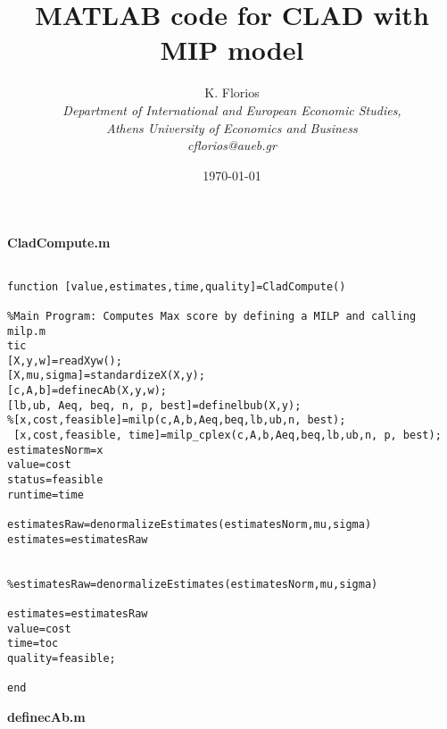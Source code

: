\documentclass[12pt]{article}
\begin{document}
\title{MATLAB code for CLAD with MIP model}
\author{K. Florios\\\textit{Department of International and European Economic Studies,}\\\textit{Athens University of Economics and Business}\\\textit{cflorios@aueb.gr}}
\date{\today}\maketitle


{\vspace*{1cm}}



\newpage

\textbf{CladCompute.m}

\begin{lstlisting}

function [value,estimates,time,quality]=CladCompute()

%Main Program: Computes Max score by defining a MILP and calling milp.m
tic
[X,y,w]=readXyw();
[X,mu,sigma]=standardizeX(X,y);
[c,A,b]=definecAb(X,y,w);
[lb,ub, Aeq, beq, n, p, best]=definelbub(X,y);
%[x,cost,feasible]=milp(c,A,b,Aeq,beq,lb,ub,n, best);
 [x,cost,feasible, time]=milp_cplex(c,A,b,Aeq,beq,lb,ub,n, p, best);
estimatesNorm=x
value=cost
status=feasible
runtime=time

estimatesRaw=denormalizeEstimates(estimatesNorm,mu,sigma)
estimates=estimatesRaw

 
%estimatesRaw=denormalizeEstimates(estimatesNorm,mu,sigma)

estimates=estimatesRaw
value=cost
time=toc
quality=feasible;

end

\end{lstlisting}


\textbf{definecAb.m}
\end{document}

